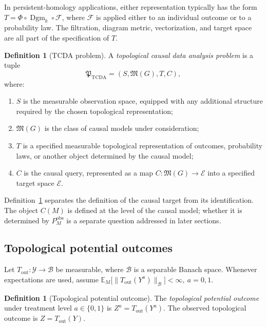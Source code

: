 \documentclass[11pt,a4paper]{article}
\theoremstyle{plain}
\theoremstyle{definition}
\newtheorem{definition}[theorem]{Definition}
\theoremstyle{remark}
\newcommand{\1}{\mathbbm{1}}
\begin{document}
In persistent-homology applications, either representation typically has the form \(T = \Phi\circ\operatorname{Dgm}_k\circ\mathcal F\), where \(\mathcal F\) is applied either to an individual outcome or to a probability law. The filtration, diagram metric, vectorization, and target space are all part of the specification of \(T\).

\begin{definition}[TCDA problem]
\label{def:tcda-problem}
A \emph{topological causal data analysis problem} is a tuple
\[
\mathfrak P_{\mathrm{TCDA}}
=
(S,\mathfrak M(G),T,C),
\]
where:

\begin{enumerate}
\item \(S\) is the measurable observation space, equipped with any additional structure required by the chosen topological representation;

\item \(\mathfrak M(G)\) is the class of causal models under
consideration;

\item \(T\) is a specified measurable topological representation of outcomes, probability laws, or another object determined by the causal model;

\item \(C\) is the causal query, represented as a map
\(C:\mathfrak M(G)\longrightarrow\mathcal E\) into a specified target space \(\mathcal E\).
\end{enumerate}
\end{definition}

Definition~\ref{def:tcda-problem} separates the definition of the causal target from its identification. The object \(C(M)\) is defined at the level of the causal model; whether it is determined by \(P_M^{\mathrm{obs}}\) is a separate question addressed in later sections.

\subsection{Topological potential outcomes}
\label{subsec:topological-potential-outcomes}

Let \(T_{\mathrm{out}}:\mathcal Y\to\mathcal B\) be measurable, where \(\mathcal B\) is a separable Banach space. Whenever expectations are used, assume
\(\mathbb E_M \bigl[ \|T_{\mathrm{out}}(Y^a)\|_{\mathcal B}
\bigr] <\infty,\ a=0,1\).

\begin{definition}[Topological potential outcome]
\label{def:topological-potential-outcome}
The \emph{topological potential outcome} under treatment level
\(a\in\{0,1\}\) is \(Z^a=T_{\mathrm{out}}(Y^a)\). The observed topological outcome is \(Z=T_{\mathrm{out}}(Y)\).
\end{definition}
\end{document}
